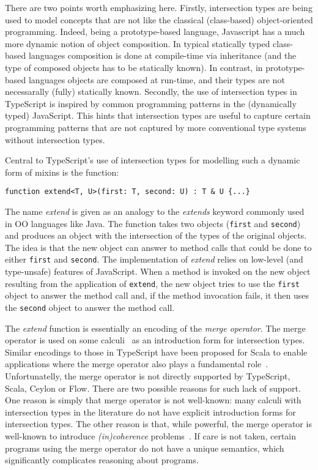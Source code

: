 \noindent There are two points worth emphasizing here. Firstly, 
intersection types are being used to model concepts that are not
like the classical (class-based) object-oriented programming. Indeed, 
being a prototype-based language, Javascript has a much more dynamic 
notion of object composition. In typical statically typed class-based languages
composition is done at compile-time via inheritance (and the type of composed
objects has to be statically known). In contrast, in prototype-based languages
objects are composed at run-time, and their types are not necessarally
(fully) statically known.  Secondly, the use of intersection types in
TypeScript is inspired by common programming patterns in the
(dynamically typed) JavaScript. This hints that intersection types are 
useful to capture certain programming patterns that are not
captured by more conventional type systems without intersection types.

Central to TypeScript's use of intersection types for modelling such a
dynamic form of mixins is the function:

\begin{lstlisting}
function extend<T, U>(first: T, second: U) : T & U {...}
\end{lstlisting}

\noindent The name \emph{extend} is given as an analogy to the
\emph{extends} keyword commonly used in OO languages like Java.
The function takes two objects (\lstinline{first} and
\lstinline{second}) and produces an object with the intersection of
the types of the original objects. The idea is that  the new object
can answer to method calls that could be done to either
\lstinline{first} and \lstinline{second}. The implementation of
\emph{extend} relies on low-level (and type-unsafe) features of 
JavaScript. When a method is invoked on the new object resulting from 
the application of \lstinline{extend}, the new object tries to use the 
\lstinline{first} object to answer the method call and, if the method
invocation fails, it then uses the \lstinline{second} object to answer
the method call. 

The \emph{extend} function is essentially an encoding of the
\emph{merge operator}. The merge operator is used on some
calculi~\cite{reynolds,castagna,dunfield2014elaborating,oliveira} as
an introduction form for intersection types. Similar encodings to
those in TypeScript have been proposed for Scala to enable
applications where the merge operator also plays a fundamental
role~\cite{}. Unfortunatelly, the merge operator is not directly
supported by TypeScript, Scala, Ceylon or Flow. There are two possible
reasons for such lack of support. One reason is simply that merge operator is
not well-known: many calculi with intersection types in the literature
do not have explicit introduction forms for intersection types. The
other reason is that, while powerful, the merge operator is well-known
to introduce \emph{(in)coherence} problems~\cite{}.  If care is not
taken, certain programs using the merge operator do not have a unique
semantics, which significantly complicates reasoning about programs.

